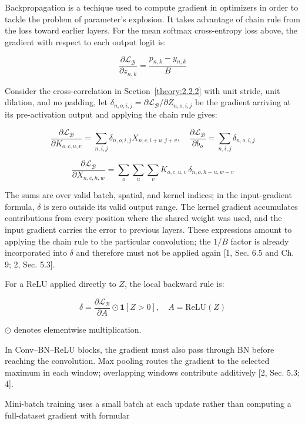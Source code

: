\documentclass[11pt,a4paper]{article}
\begin{document}
Backpropagation is a techique used to compute gradient in optimizers in order to tackle the problem of parameter's explosion. It takes advantage of chain rule from the loss toward earlier layers. For the mean softmax cross-entropy loss above, the gradient with respect to each output logit is:

\[
\frac{\partial {\mathcal{L}}_{\mathcal{B}}}{\partial {z}_{n,k}}=\frac{{p}_{n,k}-{y}_{n,k}}{B}
\]

Consider the cross-correlation in Section~\ref{theory:2.2.2} with unit stride, unit dilation, and no padding, let \({\delta }_{n,o,i,j}=\partial {\mathcal{L}}_{\mathcal{B}}/\partial {Z}_{n,o,i,j}\) be the gradient arriving at its pre-activation output and applying the chain rule gives:

\[
\frac{\partial {\mathcal{L}}_{\mathcal{B}}}{\partial {K}_{o,c,u,v}}=\sum _{n,i,j} {\delta }_{n,o,i,j}{X}_{n,c,i+u,j+v},\quad \frac{\partial {\mathcal{L}}_{\mathcal{B}}}{\partial {b}_{o}}=\sum _{n,i,j} {\delta }_{n,o,i,j}
\]

\[
\frac{\partial {\mathcal{L}}_{\mathcal{B}}}{\partial {X}_{n,c,h,w}}=\sum _{o} \sum _{u} \sum _{v} {K}_{o,c,u,v}\,{\delta }_{n,o,h-u,w-v}
\]

The sums are over valid batch, spatial, and kernel indices; in the input-gradient formula, \(\delta\) is zero outside its valid output range. The kernel gradient accumulates contributions from every position where the shared weight was used, and the input gradient carries the error to previous layers. These expressions amount to applying the chain rule to the particular convolution; the \(1/B\) factor is already incorporated into \(\delta\) and therefore must not be applied again [1, Sec. 6.5 and Ch. 9; 2, Sec. 5.3].

For a ReLU applied directly to \(Z\), the local backward rule is:

\[
\delta =\frac{\partial {\mathcal{L}}_{\mathcal{B}}}{\partial A}\odot \boldsymbol{1}[Z>0],\quad A=\mathrm{ReLU}(Z)
\]

\(\odot \) denotes elementwise multiplication.

In Conv--BN--ReLU blocks, the gradient must also pass through BN before reaching the convolution. Max pooling routes the gradient to the selected maximum in each window; overlapping windows contribute additively [2, Sec. 5.3; 4].

Mini-batch training uses a small batch at each update rather than computing a full-dataset gradient with formular
\end{document}

